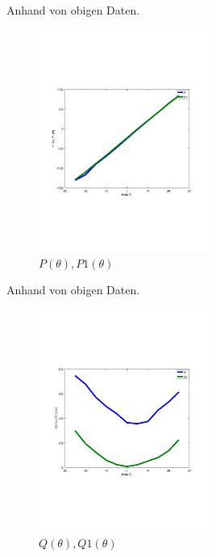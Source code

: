 Anhand von obigen Daten.
\begin{figure}[!ht]
  \begin{center}
  \includegraphics[width=0.5\textwidth, trim={1cm 6.5cm 2cm 7cm},clip]{pic/6_1_grundfrequenztaktung/6_1_2_einst_wirk_und_blindleistung/P_P1.pdf}
  \caption{$P(\theta), P1(\theta)$}
  \label{fig:6_1_2_2}
  \end{center}
\end{figure}


Anhand von obigen Daten.
\begin{figure}[!ht]
  \begin{center}
  \includegraphics[width=0.5\textwidth, trim={1cm 6.5cm 2cm 7cm},clip]{pic/6_1_grundfrequenztaktung/6_1_2_einst_wirk_und_blindleistung/Q_Q1.pdf}
  \caption{$Q(\theta), Q1(\theta)$}
  \label{fig:6_1_2_3}
  \end{center}
\end{figure}



\clearpage